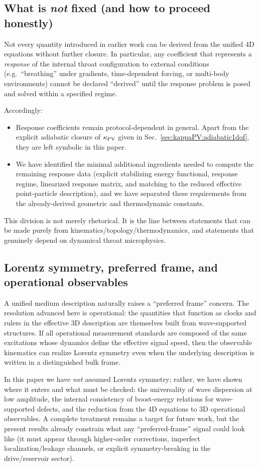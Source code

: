\documentclass[11pt]{article}
\begin{document}
\subsection*{What is \emph{not} fixed (and how to proceed honestly)}
Not every quantity introduced in earlier work can be derived from the unified 4D equations without further closure. In particular, any coefficient that represents a \emph{response} of the internal throat configuration to external conditions (e.g.\ ``breathing'' under gradients, time-dependent forcing, or multi-body environments) cannot be declared ``derived'' until the response problem is posed and solved within a specified regime.

Accordingly:
\begin{itemize}
  \item Response coefficients remain protocol-dependent in general. Apart from the explicit adiabatic closure of \(\kappa_{\rm PV}\) given in Sec.~\ref{sec:kappaPV:adiabatic1dof}, they are left symbolic in this paper.
  \item We have identified the minimal additional ingredients needed to compute the remaining response data (explicit stabilizing energy functional, response regime, linearized response matrix, and matching to the reduced effective point-particle description), and we have separated these requirements from the already-derived geometric and thermodynamic constants.
\end{itemize}

This division is not merely rhetorical. It is the line between statements that can be made purely from kinematics/topology/thermodynamics, and statements that genuinely depend on dynamical throat microphysics.

\subsection*{Lorentz symmetry, preferred frame, and operational observables}
A unified medium description naturally raises a ``preferred frame'' concern. The resolution advanced here is operational: the quantities that function as clocks and rulers in the effective 3D description are themselves built from wave-supported structures. If all operational measurement standards are composed of the same excitations whose dynamics define the effective signal speed, then the observable kinematics can realize Lorentz symmetry even when the underlying description is written in a distinguished bulk frame.

In this paper we have \emph{not} assumed Lorentz symmetry; rather, we have shown where it enters and what must be checked: the universality of wave dispersion at low amplitude, the internal consistency of boost-energy relations for wave-supported defects, and the reduction from the 4D equations to 3D operational observables. A complete treatment remains a target for future work, but the present results already constrain what any ``preferred-frame'' signal could look like (it must appear through higher-order corrections, imperfect localization/leakage channels, or explicit symmetry-breaking in the drive/reservoir sector).
\end{document}
